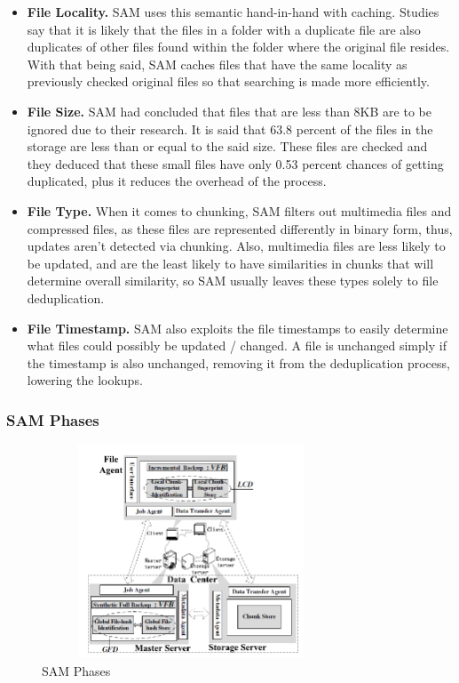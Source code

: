 \documentclass[journal]{IEEEtran}
\begin{document}
\begin{itemize}
	\item \textbf{File Locality.} SAM uses this semantic hand-in-hand with caching. Studies say that it is likely that the files in a folder with a duplicate file are also duplicates of other files found within the folder where the original file resides. With that being said, SAM caches files that have the same locality as previously checked original files so that searching is made more efficiently.

	\item \textbf{File Size.} SAM had concluded that files that are less than 8KB are to be ignored due to their research. It is said that 63.8 percent of the files in the storage are less than or equal to the said size. These files are checked and they deduced that these small files have only 0.53 percent chances of getting duplicated, plus it reduces the overhead of the process.

	\item \textbf{File Type.} When it comes to chunking, SAM filters out multimedia files and compressed files, as these files are represented differently in binary form, thus, updates aren’t detected via chunking. Also, multimedia files are less likely to be updated, and are the least likely to have similarities in chunks that will determine overall similarity, so SAM usually leaves these types solely to file deduplication.
	
	\item \textbf{File Timestamp.} SAM also exploits the file timestamps to easily determine what files could possibly be updated / changed. A file is unchanged simply if the timestamp is also unchanged, removing it from the deduplication process, lowering the lookups.
	
\end{itemize}

\subsubsection{SAM Phases}

\begin{figure}[!t]
\centering
\includegraphics[height=2.5in, width=3.5in]{image6.png}
\caption{SAM Phases}
\end{figure}
\end{document}
